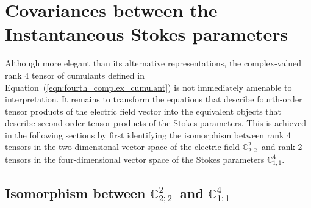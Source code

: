 \documentclass[twocolumn]{aastex6}
\newcommand{\Eqn}[1]{Equation~(\ref{eqn:#1})}
\newcommand{\rankfour}{\ensuremath{\mathbb{C}^2_{2;2}}}
\newcommand{\ranktwo}{\ensuremath{\mathbb{C}^4_{1;1}}}
\begin{document}

\section{Covariances between the Instantaneous Stokes parameters}
\label{sec:Stokes_statistics}

Although more elegant than its alternative representations, the
complex-valued rank 4 tensor of cumulants defined in
\Eqn{fourth_complex_cumulant} is not immediately amenable to
interpretation.
%
It remains to transform the equations that describe fourth-order
tensor products of the electric field vector into the equivalent
objects that describe second-order tensor products of the Stokes
parameters.
%
This is achieved in the following sections by first identifying the
isomorphism between rank 4 tensors in the two-dimensional vector space
of the electric field \rankfour\ and rank 2 tensors in the
four-dimensional vector space of the Stokes parameters \ranktwo.

\newpage
\subsection{Isomorphism between \rankfour\ and \ranktwo}
  
\end{document}

